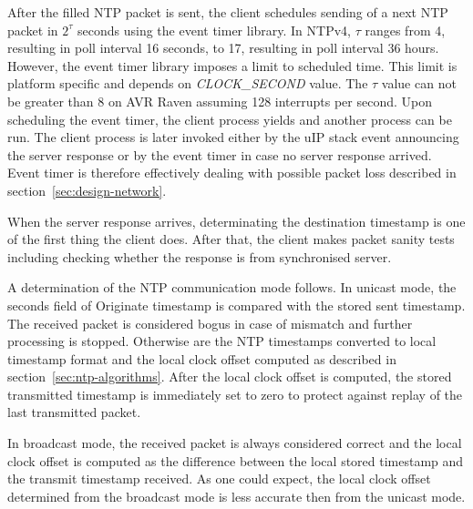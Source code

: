 After the filled NTP packet is sent, the client schedules
sending of a next NTP packet in $2^{\tau}$ seconds
using the event timer library.
In NTPv4, $\tau$ ranges from 4, resulting in poll interval 16 seconds,
to 17, resulting in poll interval 36 hours.
However, the event timer library imposes a limit to scheduled time.
This limit is platform specific and depends on {\it{CLOCK\_SECOND}} value.
The $\tau$ value can not be greater than 8 on AVR Raven assuming 128 interrupts per second.
Upon scheduling the event timer, the client process yields
and another process can be run.
The client process is later invoked either by the uIP stack event
announcing the server response
or by the event timer in case no server response arrived.
Event timer is therefore effectively
dealing with possible packet loss described in section~\ref{sec:design-network}.

When the server response arrives,
determinating the destination timestamp is one of the first thing the client does.
After that, the client makes packet sanity tests including
checking whether the response is from synchronised server.

A determination of the NTP communication mode follows.
In unicast mode, the seconds field of Originate timestamp
is compared with the stored sent timestamp.
The received packet is considered bogus in case of mismatch and further processing is stopped.
Otherwise are the NTP timestamps converted to local timestamp format and
the local clock offset computed as described in section~\ref{sec:ntp-algorithms}.
After the local clock offset is computed,
the stored transmitted timestamp is immediately set to zero
to protect against replay of the last transmitted packet.

In broadcast mode, the received packet is always considered correct
and the local clock offset is computed as the difference between the local stored timestamp
and the transmit timestamp received.
As one could expect, the local clock offset determined from the broadcast mode
is less accurate then from the unicast mode.

